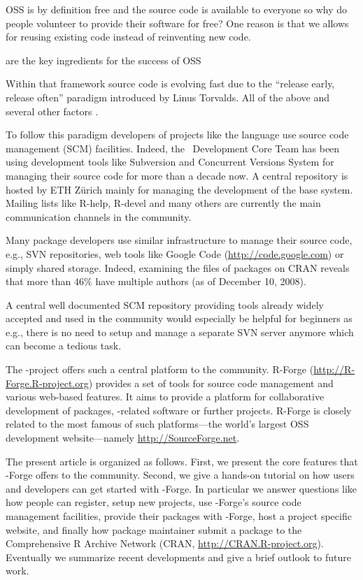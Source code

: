 OSS is by definition free and the source code is available to everyone
so why do people volunteer to provide their software for free? One
reason is that we allows for reusing
existing code instead of reinventing new code. 

\citep[see][]{forge:Raymond:1999}
are the key ingredients for the success of OSS


Within that framework source code is
evolving fast due to the ``release 
early, release often'' paradigm introduced by Linus Torvalds. All of
the above and several other factors .


To follow this paradigm developers of projects like the
language \R{} use source code management (SCM) facilities. Indeed, the
\R{}~Development Core Team has been using 
development tools like Subversion \citep[SVN,
see][]{forge:Pilato+Collins-Sussman+Fitzpatrick:2004} and Concurrent
Versions System \citep[CVS, see][]{forge:Cederqvist:2006} 
for managing their source code for more than a decade now.  
A central repository is hosted by ETH Z\"urich mainly for
managing the development of the base \R{} system. Mailing lists like
R-help, R-devel and many others are currently the main communication
channels in  the \R{} community.

Many \R{} package developers use similar infrastructure to manage their
source code, e.g., SVN repositories, web tools like Google Code
(\url{http://code.google.com}) or simply shared storage. Indeed,
examining the  files of packages on CRAN 
reveals that more than $46\%$ have multiple 
authors (as of December 10, 2008). 

A central well documented SCM repository providing tools already
widely accepted and used in the \R{} community would especially be
helpful for beginners as e.g., there is no need to setup and manage a
separate SVN server anymore which can become a tedious task. 

The \R{}-project offers such a central platform to the \R{}
community. R-Forge (\url{http://R-Forge.R-project.org}) provides a set
of tools for source code management and various web-based
features. It aims to provide a platform for collaborative development of
\R{} packages, \R{}-related software or further projects. R-Forge is
closely related to the most famous of such platforms---the 
world's largest OSS development website---namely
\url{http://SourceForge.net}.

The present article is organized as follows. First, we present the core
features that \R{}-Forge offers to the \R{} community. Second, we
give a hands-on tutorial on how users and developers can get started with 
\R{}-Forge. In particular we answer questions like how people
can register, setup new projects, use \R{}-Forge's source code
management facilities, provide their  
packages with \R{}-Forge, host a project specific website, and
finally how package maintainer submit a package to the Comprehensive R
Archive Network (CRAN, \url{http://CRAN.R-project.org}).
Eventually we summarize recent developments and give a brief outlook
to future work.


